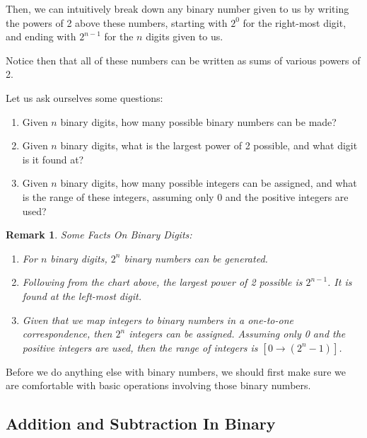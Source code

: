 \documentclass[12pt]{article}
\newtheorem*{remark}
{Remark}
\begin{document}
    Then, we can intuitively break down any binary number given to us by writing
    the powers of 2 above these numbers, starting with $2^0$ for the right-most digit,
    and ending with $2^{n - 1}$ for the $n$ digits given to us.

    Notice then that all of these numbers can be written as sums of various powers of 2.

    Let us ask ourselves some questions:

    \begin{enumerate}
        \item Given $n$ binary digits, how many possible binary numbers can be made?
        \item Given $n$ binary digits, what is the largest power of 2 possible, and what digit
        is it found at?
        \item Given $n$ binary digits, how many possible integers can be assigned, and what
        is the range of these integers, assuming only 0 and the positive integers are used?
    \end{enumerate}
    

    \begin{remark} Some Facts On Binary Digits:
            \begin{enumerate}
                \item For $n$ binary digits, $2^n$ binary numbers can be generated.
                \item Following from the chart above, the largest power of 2 possible is
                $2^{n - 1}$. It is found at the left-most digit.
                \item Given that we map integers to binary numbers in a one-to-one correspondence,
                then $2^n$ integers can be assigned. Assuming only 0 and the positive integers are used,
                then the range of integers is $[0 \rightarrow (2^{n} - 1)]$.
            \end{enumerate}
        \end{remark}


        
Before we do anything else with binary numbers, we should first make sure we are comfortable with
basic operations involving those binary numbers.

\subsection*{Addition and Subtraction In Binary}
\end{document}
